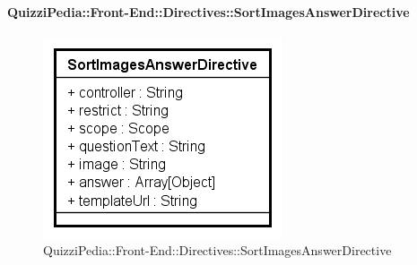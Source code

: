 		\paragraph{QuizziPedia::Front-End::Directives::SortImagesAnswerDirective}
		
		\label{QuizziPedia::Front-End::Directives::SortImagesAnswerDirective}
		
		\begin{figure}[ht]
			\centering
			\includegraphics[scale=0.80,keepaspectratio]{UML/Classi/Front-End/QuizziPedia_Front-end_Templates_SortImagesAnswerTemplate.png}
			\caption{QuizziPedia::Front-End::Directives::SortImagesAnswerDirective}
		\end{figure} \FloatBarrier
		
